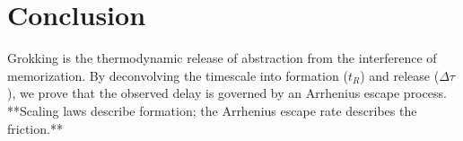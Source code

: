 \documentclass[11pt]{article}
\begin{document}
\section{Conclusion}
Grokking is the thermodynamic release of abstraction from the interference of memorization. By deconvolving the timescale into formation ($t_R$) and release ($\Delta \tau$), we prove that the observed delay is governed by an Arrhenius escape process. **Scaling laws describe formation; the Arrhenius escape rate describes the friction.**



\end{document}
